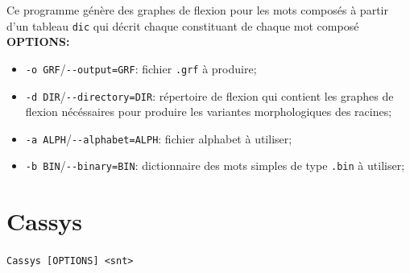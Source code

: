 \bigskip
\noindent Ce programme génère des graphes de flexion pour les mots composés à partir d'un tableau
\verb+dic+ qui décrit chaque constituant de chaque mot composé
\bigskip
\noindent \textbf{OPTIONS:}
\begin{itemize}
\item \verb+-o GRF+/\verb+--output=GRF+: fichier \verb+.grf+ à produire;
\item \verb+-d DIR+/\verb+--directory=DIR+: répertoire de flexion qui contient les graphes de
	flexion nécéssaires pour produire les variantes morphologiques des racines;
\item \verb+-a ALPH+/\verb+--alphabet=ALPH+: fichier alphabet à utiliser;
\item \verb+-b BIN+/\verb+--binary=BIN+:  dictionnaire des mots simples de type \verb+.bin+ à
	utiliser;
\end{itemize}






\section{Cassys}
\verb+Cassys [OPTIONS] <snt>+

